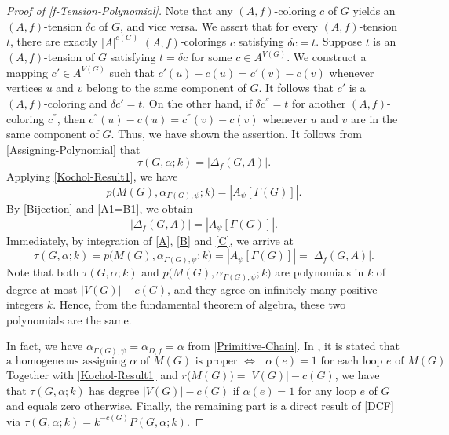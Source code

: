 \documentclass[12pt]{article}%
\numberwithin{equation}{section}
\begin{document}
\begin{proof}[Proof of  \autoref{f-Tension-Polynomial}]
Note that any $(A,f)$-coloring $c$ of $G$ yields an $(A,f)$-tension $\delta c$ of $G$,  and vice versa. We assert that for every $(A,f)$-tension $t$, there are exactly $|A|^{c(G)}$ $(A,f)$-colorings $c$ satisfying $\delta c=t$. Suppose $t$ is an $(A,f)$-tension of $G$ satisfying $t=\delta c$ for some $c\in A^{V(G)}$. We construct a mapping $c'\in A^{V(G)}$ such that $c'(u)-c(u)=c'(v)-c(v)$ whenever vertices $u$ and $v$ belong to the same component of $G$. It follows that $c'$ is a $(A,f)$-coloring and $\delta c'=t$. On the other hand, if $\delta c^{''}=t$ for another $(A,f)$-coloring $c^{''}$, then $c^{''}(u)-c(u)=c^{''}(v)-c(v)$ whenever $u$ and $v$ are in the same component of $G$. Thus, we have shown the assertion. It follows from \autoref{Assigning-Polynomial} that 
\begin{equation}\label{A}
\tau(G,\alpha;k)=|\Delta_f(G,A)|.
\end{equation}
Applying  \autoref{Kochol-Result1}, we have 
\begin{equation}\label{B}
p\big(M(G),\alpha_{\Gamma(G),\psi};k\big)=|A_\psi[\Gamma(G)]|.
\end{equation}
By \autoref{Bijection} and \autoref{A1=B1}, we obtain
\begin{equation}\label{C}
|\Delta_f(G,A)|=|A_\psi[\Gamma(G)]|.
\end{equation}
Immediately, by integration of \eqref{A}, \eqref{B} and \eqref{C}, we arrive at 
\[
\tau(G,\alpha;k)=p\big(M(G),\alpha_{\Gamma(G),\psi};k\big)=|A_\psi[\Gamma(G)]|=|\Delta_f(G,A)|.
\]
Note that both $\tau(G,\alpha;k)$ and $p\big(M(G),\alpha_{\Gamma(G),\psi};k\big)$ are polynomials in $k$ of degree at most $|V(G)|-c(G)$, and they agree on infinitely many positive integers $k$. Hence, from the fundamental theorem of algebra, these two polynomials are the same.

In fact, we have $\alpha_{\Gamma(G),\psi}=\alpha_{D,f}=\alpha$ from \eqref{Primitive-Chain}. In \cite[Theorem 3]{Kochol2024}, it is stated that
\[
\text{a homogeneous assigning $\alpha$ of $M(G)$ is proper $\Longleftrightarrow$ $\alpha(e)=1$ for each loop $e$ of $M(G)$}.
\]
Together with \autoref{Kochol-Result1} and $r\big(M(G)\big)=|V(G)|-c(G)$, we have that $\tau(G,\alpha;k)$ has degree $|V(G)|-c(G)$ if $\alpha(e)=1$ for any loop $e$ of $G$ and equals zero otherwise. Finally, the remaining part is a direct result of \autoref{DCF} via $\tau(G,\alpha;k)=k^{-c(G)}P(G,\alpha;k)$.
\end{proof}
\end{document}
